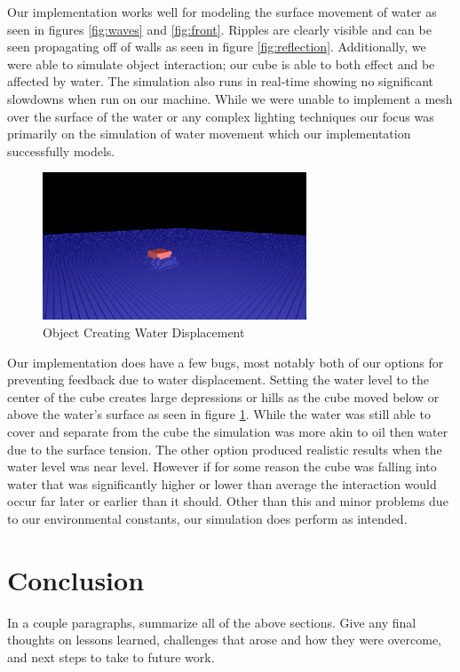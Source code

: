 \documentclass[12pt,titlepage]{article}
\begin{document}
Our implementation works well for modeling the surface movement of water as 
seen in figures \ref{fig:waves} and \ref{fig:front}.  
Ripples are clearly visible and can be seen propagating off of walls as seen in 
figure \ref{fig:reflection}. 
Additionally, we were able to simulate object interaction; our cube is able to 
both effect and be affected by water.  The simulation also runs in real-time 
showing no significant slowdowns when run on our machine. While we were unable 
to implement a mesh over the surface of the water or any complex lighting 
techniques our focus was primarily on the simulation of water movement which 
our implementation successfully models.

\begin{figure}[H]
    \caption{Object Creating Water Displacement}
    \label{fig:displacement}
    \centering
    \includegraphics[width=0.7\textwidth]{../www/images/objectWaterDisplacement}
\end{figure}

Our implementation does have a few bugs, most notably both of our options for 
preventing feedback due to water displacement.  Setting the water level to the 
center of the cube creates large depressions or hills as the cube moved below 
or above the water’s surface as seen in figure \ref{fig:displacement}.  While 
the water was still able to cover and separate from the cube the simulation was 
more akin to oil then water due to the surface tension.  The other option 
produced realistic results when the water level was near level.  However if for 
some reason the cube was falling into water that was significantly higher or 
lower than average the interaction would occur far later or earlier than it 
should.  Other than this and minor problems due to our environmental constants, 
our simulation does perform as intended.

\section{Conclusion}

In a couple paragraphs, summarize all of the above sections. Give any final thoughts on lessons learned, challenges that arose and how they were overcome, and next steps to take to future work.

\nocite{*}
\printbibliography
\end{document}
